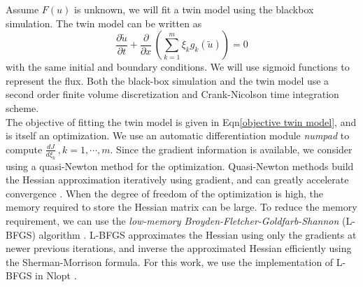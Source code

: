 \documentclass[a4paper,onecolumn]{article}
\theoremstyle{remark}
\begin{document}
\noindent Assume $F(u)$ is unknown, we will fit a twin model 
using the blackbox simulation.
The twin model can be written as
\begin{equation}
    \frac{\partial \tilde{u}}{\partial t} + \frac{\partial}{\partial x}\,
    \left(\sum_{k=1}^m \xi_k g_{k}(\tilde{u})\right) = 0
    \label{twin model 3}
\end{equation}
with the same initial and boundary conditions. We will
use sigmoid functions to represent the flux. Both the black-box simulation
and the twin model use a second order finite volume discretization and 
Crank-Nicolson time integration scheme.\\

\noindent The objective of fitting the twin model is given in Eqn\eqref{objective twin model},
and is itself an optimization.
We use an automatic differentiation module \textit{numpad} \cite{numpad} to compute
$\frac{dJ}{d\xi_k}\,, k=1,\cdots, m$.
Since the gradient information is available, we consider using a quasi-Newton method
for the optimization. Quasi-Newton methods build the Hessian approximation iteratively 
using gradient, and can greatly accelerate convergence \cite{Quasi-Newton Review}.
When the degree of freedom of the optimization is high, the memory required to 
store the Hessian matrix can be large. To reduce the memory requirement, 
we can use the \emph{low-memory Broyden-Fletcher-Goldfarb-Shannon} (L-BFGS) algorithm
\cite{nlopt, LBFGS}. 
L-BFGS approximates the Hessian using only the gradients at newer previous iterations,
and inverse the approximated Hessian efficiently using the Sherman-Morrison formula.
For this work, we
use the implementation of L-BFGS in Nlopt \cite{nlopt}.\\
\end{document}
